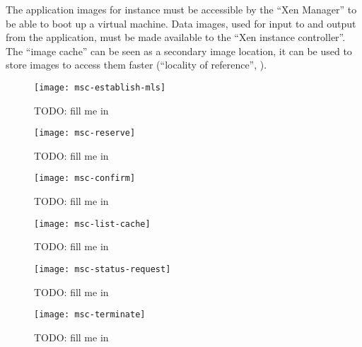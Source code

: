 The  application images  for  instance  must be  accessible  by the  ``Xen
Manager'' to be able to boot  up a virtual machine.  Data images, used for
input to  and output from the  application, must be made  available to the
``Xen  instance  controller''.  The  ``image  cache''  can  be seen  as  a
secondary image  location, it can be  used to store images  to access them
faster (``locality of reference'', \cite{locality-principle}).

\begin{figure}
  \begin{center}
    \texttt{[image: msc-establish-mls]}
  \end{center}
  \caption[MSC Message Layer Security]{TODO: fill me in}
  \label{fig:msc-establish-mls}
\end{figure}

\begin{figure}
  \begin{center}
    \texttt{[image: msc-reserve]}
  \end{center}
  \caption[MSC Make Reservation]{TODO: fill me in}
  \label{fig:msc-reserve}
\end{figure}

\begin{figure}
  \begin{center}
    \texttt{[image: msc-confirm]}
  \end{center}
  \caption[MSC Confirm Reservation]{TODO: fill me in}
  \label{fig:msc-confirm}
\end{figure}

\begin{figure}
  \begin{center}
    \texttt{[image: msc-list-cache]}
  \end{center}
  \caption[MSC List Cache Entries]{TODO: fill me in}
  \label{fig:msc-list-cache}
\end{figure}

\begin{figure}
  \begin{center}
    \texttt{[image: msc-status-request]}
  \end{center}
  \caption[MSC Request Task Status]{TODO: fill me in}
  \label{fig:msc-status-request}
\end{figure}

\begin{figure}
  \begin{center}
    \texttt{[image: msc-terminate]}
  \end{center}
  \caption[MSC Terminate Task Request]{TODO: fill me in}
  \label{fig:msc-terminate}
\end{figure}

